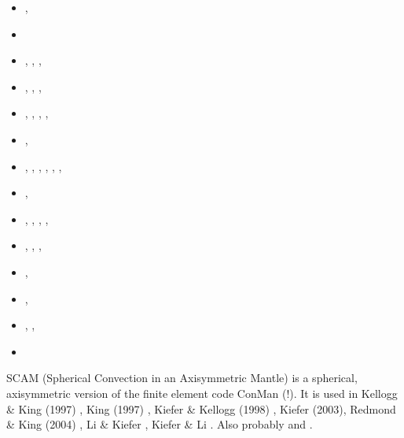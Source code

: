 \begin{small}
\begin{itemize}
                             \textcite{elha00},  \textcite{lemo00}
\item[\twothousandone]       \textcite{coha01},  \textcite{huke01}
\item[\twothousandtwo]       \textcite{elvh02}
\item[\twothousandthree]     \textcite{fasa03},  \textcite{taki03},
                             \textcite{safa03},  \textcite{taki03}
\item[\twothousandfour]      \textcite{elhg04},  \textcite{shha04}, \textcite{reki04},
                             \textcite{nabs04}
\item[\twothousandfive]      \textcite{kogk05},  \textcite{colt05},
                             \textcite{mish05},  \textcite{shha05}, \textcite{tagu05}
\item[\twothousandsix]       \textcite{nake06},  \textcite{cosc06}
\item[\twothousandseven]     \textcite{nake07},  \textcite{dadh07}, \textcite{copb07},
                             \textcite{elki07},  \textcite{lohd07}, \textcite{nake07},
                             \textcite{reki07}
\item[\twothousandeight]     \textcite{hash08},  \textcite{dadh08}
\item[\twothousandnine]      \textcite{faho09},  \textcite{heaa09}, \textcite{king09}, 
                             \textcite{leki09},  \textcite{wazh09}
\item[\twothousandten]       \textcite{kilv10},  \textcite{cows10}, 
                             \textcite{hash10},  \textcite{leki10}
\item[\twothousandeleven]    \textcite{hash11},  \textcite{leki11}
\item[\twothousandfourteen]  \textcite{kile14},  \textcite{leli14}
\item[\twothousandfifteen]   \textcite{kifr15},  \textcite{kilk15}, \textcite{lile15}
\item[\twothousandtwentytwo] \textcite{gadm22}
\end{itemize}
\end{small}

SCAM (Spherical Convection in an Axisymmetric Mantle) is a spherical, axisymmetric version 
of the finite element code ConMan (!). It is used in Kellogg \& King (1997) \cite{keki97}, 
King (1997) \cite{king97}, Kiefer \& Kellogg (1998) \cite{kike98}, Kiefer (2003)\cite{kief03}, 
Redmond \& King (2004) \cite{reki04}, Li \& Kiefer \cite{liki07}, Kiefer \& Li \cite{kili16}.
Also probably \cite{fari94} and \cite{fari95}.

